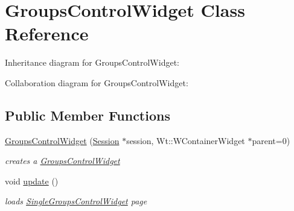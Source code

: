 \hypertarget{classGroupsControlWidget}{}\section{Groups\+Control\+Widget Class Reference}
\label{classGroupsControlWidget}


Inheritance diagram for Groups\+Control\+Widget\+:


Collaboration diagram for Groups\+Control\+Widget\+:
\subsection*{Public Member Functions}
\begin{DoxyCompactItemize}
\item 
\hyperlink{classGroupsControlWidget_a4d6a0e40f6968c53e163c167612932d4}{Groups\+Control\+Widget} (\hyperlink{classSession}{Session} $\ast$session, Wt\+::\+W\+Container\+Widget $\ast$parent=0)
\begin{DoxyCompactList}\small\item\em creates a \hyperlink{classGroupsControlWidget}{Groups\+Control\+Widget} \end{DoxyCompactList}\item 
void \hyperlink{classGroupsControlWidget_a6b7f7244d67dcdc7e1e946e0e1959f8d}{update} ()
\begin{DoxyCompactList}\small\item\em loads \hyperlink{classSingleGroupsControlWidget}{Single\+Groups\+Control\+Widget} page \end{DoxyCompactList}\end{DoxyCompactItemize}
